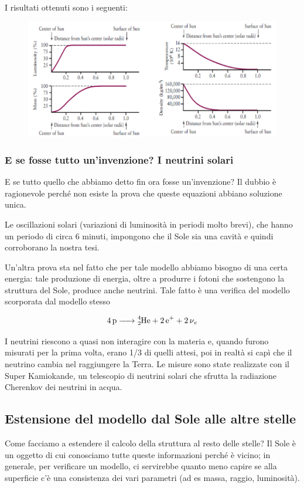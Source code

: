 I risultati ottenuti sono i seguenti:

\begin{figure}[H]
    \centering
    \includegraphics[scale=0.7]{soluzioni.png}
\end{figure}

\subsubsection{E se fosse tutto un'invenzione? I neutrini solari}
E se tutto quello che abbiamo detto fin ora fosse un'invenzione? Il dubbio è ragionevole perché non esiste la prova che queste equazioni abbiano soluzione unica.

Le oscillazioni solari (variazioni di luminosità in periodi molto brevi), che hanno un periodo di circa 6 minuti, impongono che il Sole sia una cavità e quindi corroborano la nostra tesi.

Un'altra prova sta nel fatto che per tale modello abbiamo bisogno di una certa energia: tale produzione di energia, oltre a produrre i fotoni che sostengono la struttura del Sole, produce anche neutrini. Tale fatto è una verifica del modello scorporata dal modello stesso

$$\ce{4p -> _2^4He + 2 e^{+} + 2 \nu_e}$$

I neutrini riescono a quasi non interagire con la materia e, quando furono misurati per la prima volta, erano 1/3 di quelli attesi, poi in realtà si capì che il neutrino cambia nel raggiungere la Terra. Le misure sono state realizzate con il Super Kamiokande, un telescopio di neutrini solari che sfrutta la radiazione Cherenkov dei neutrini in acqua.

\subsection{Estensione del modello dal Sole alle altre stelle}
Come facciamo a estendere il calcolo della struttura al resto delle stelle? Il Sole è un oggetto di cui conosciamo tutte queste informazioni perché è vicino; in generale, per verificare un modello, ci servirebbe quanto meno capire se alla superficie c'è una consistenza dei vari parametri (ad es massa, raggio, luminosità).

